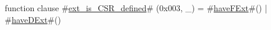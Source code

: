 function clause #\hyperref[sailRISCVzextzyiszyCSRzydefined]{ext\_is\_CSR\_defined}# (0x003, _) = #\hyperref[sailRISCVzhaveFExt]{haveFExt}#() | #\hyperref[sailRISCVzhaveDExt]{haveDExt}#()
